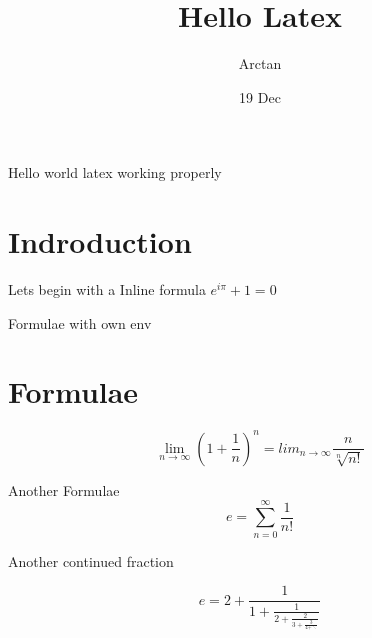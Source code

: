 \documentclass{article}
\title{Hello Latex}
\author{Arctan}
\date{19 Dec}
\begin{document}
    \maketitle
    Hello world  latex working properly
    \section{Indroduction}

    Lets begin with a Inline formula $e^{i\pi} + 1 =0$

Formulae with own env
    \section{Formulae}
    $$ \lim_{n\to\infty} \left(1+\frac{1}{n}\right)^n = lim_{n\to\infty}\frac{n}{\sqrt[n]{n!}} $$

    Another Formulae
    $$e = \sum_{n=0}^{\infty}\frac{1}{n!}$$
    
    Another continued fraction

    $$e = 2+\frac{1}{1+\frac{1}{2+\frac{2}{3+\frac{3}{4+\ddots}}}}$$
\end{document}
